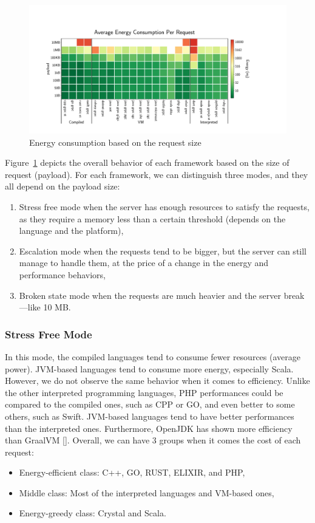 \begin{figure}[!hbt]
    \begin{center}
        \includegraphics[width=1.2\linewidth]{imgs/energy_cost_payload}
    \end{center}
    \caption{Energy consumption based on the request size}\label{fig:energy_cost_payload}
\end{figure}
Figure~\ref{fig:energy_cost_payload} depicts the overall behavior of each framework based on the size of request (payload).
For each framework, we can distinguish three modes, and they all depend on the payload size:
\begin{enumerate}
    \item \textsf{Stress free} mode when the server has enough resources to satisfy the requests, as they require a memory less than a certain threshold (depends on the language and the platform),
    \item \textsf{Escalation} mode when the requests tend to be bigger, but the server can still manage to handle them, at the price of a change in the energy and performance behaviors,
    \item \textsf{Broken state} mode when the requests are much heavier and the server break—like 10 MB.%
\end{enumerate}

\subsubsection{Stress Free Mode}
In this mode, the compiled languages tend to consume fewer resources (average power).
JVM-based languages tend to consume more energy, especially Scala.
However, we do not observe the same behavior when it comes to efficiency.
Unlike the other interpreted programming languages, PHP performances could be compared to the compiled ones, such as CPP or GO, and even better to some others, such as Swift.
JVM-based languages tend to have better performances than the interpreted ones.
Furthermore, OpenJDK has shown more efficiency than GraalVM [].
Overall, we can have 3 groups when it comes the cost of each request:
\begin{itemize}
    \item Energy-efficient class: C++, GO, RUST, ELIXIR, and PHP,
    \item Middle class: Most of the interpreted languages and VM-based ones,
    \item Energy-greedy class: Crystal and Scala.
\end{itemize}

